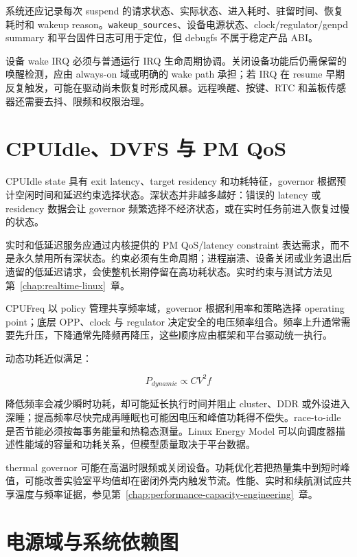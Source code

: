 系统还应记录每次 suspend 的请求状态、实际状态、进入耗时、驻留时间、恢复耗时和 wakeup reason。\texttt{wakeup\_sources}、设备电源状态、clock/regulator/genpd summary 和平台固件日志可用于定位，但 debugfs 不属于稳定产品 ABI。

设备 wake IRQ 必须与普通运行 IRQ 生命周期协调。关闭设备功能后仍需保留的唤醒检测，应由 always-on 域或明确的 wake path 承担；若 IRQ 在 resume 早期反复触发，可能在驱动尚未恢复时形成风暴。远程唤醒、按键、RTC 和盖板传感器还需要去抖、限频和权限治理。

\section{CPUIdle、DVFS 与 PM QoS}

CPUIdle state 具有 exit latency、target residency 和功耗特征，governor 根据预计空闲时间和延迟约束选择状态\cite{linux-cpuidle}。深状态并非越多越好：错误的 latency 或 residency 数据会让 governor 频繁选择不经济状态，或在实时任务前进入恢复过慢的状态。

实时和低延迟服务应通过内核提供的 PM QoS/latency constraint 表达需求，而不是永久禁用所有深状态。约束必须有生命周期；进程崩溃、设备关闭或业务退出后遗留的低延迟请求，会使整机长期停留在高功耗状态。实时约束与测试方法见\mbox{第~\ref{chap:realtime-linux}~章}。

CPUFreq 以 policy 管理共享频率域，governor 根据利用率和策略选择 operating point；底层 OPP、clock 与 regulator 决定安全的电压频率组合\cite{linux-cpufreq}。频率上升通常需要先升压，下降通常先降频再降压，这些顺序应由框架和平台驱动统一执行。

动态功耗近似满足：

\begin{equation}
  P_{dynamic}\propto C V^2 f
\end{equation}

降低频率会减少瞬时功耗，却可能延长执行时间并阻止 cluster、DDR 或外设进入深睡；提高频率尽快完成再睡眠也可能因电压和峰值功耗得不偿失。race-to-idle 是否节能必须按每事务能量和热稳态测量。Linux Energy Model 可以向调度器描述性能域的容量和功耗关系，但模型质量取决于平台数据\cite{linux-energy-model}。

thermal governor 可能在高温时限频或关闭设备。功耗优化若把热量集中到短时峰值，可能改善实验室平均值却在密闭外壳内触发节流。性能、实时和续航测试应共享温度与频率证据，参见\mbox{第~\ref{chap:performance-capacity-engineering}~章}。

\section{电源域与系统依赖图}

